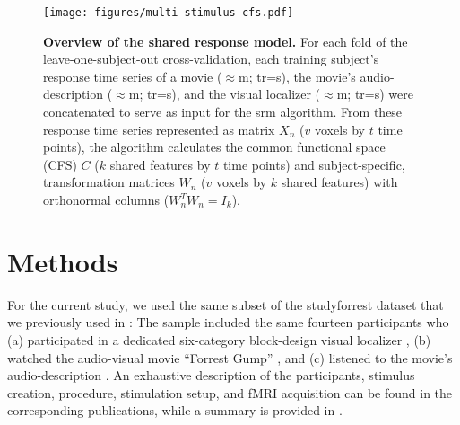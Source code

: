 
\begin{figure*}[tbp]
\centering
\texttt{[image: figures/multi-stimulus-cfs.pdf]}
\caption{
%
\textbf{Overview of the shared response model.
}
    For each fold of the leave-one-subject-out cross-validation, each training
    subject's response time series of
    a movie ($\approx$\unit[120]{m}; \ac{tr}=\unit[2]{s}),
    the movie's audio-description ($\approx$\unit[120]{m}; \ac{tr}=\unit[2]{s}),
    and the visual localizer ($\approx$\unit[21]{m}; \ac{tr}=\unit[2]{s})
    were concatenated to serve as input for the \ac{srm} algorithm.
    From these response time series represented as matrix $X_{n}$ ({$v$} voxels
    by $t$ time points), the algorithm calculates the common functional
    space (CFS) $C$ ($k$ shared features by $t$ time points) and
    subject-specific, transformation matrices $W_{n}$
    ($v$ voxels by $k$ shared features) with orthonormal columns
    ($W_{n}^{T}W_{n}=I_{k}$).
} \label{fig:multi-stimulus-cfs} \end{figure*}





\section{Methods}


For the current study, we used the same subset of the studyforrest dataset that
we previously used in \citet{haeusler2022processing}:
%
The sample included the same fourteen participants who
(a) participated in a dedicated six-category block-design visual localizer
\citep{sengupta2016extension},
(b) watched the audio-visual movie ``Forrest Gump''
\citep{hanke2016simultaneous}, and
(c) listened to the movie's audio-description \citep{hanke2014audiomovie}.
An exhaustive description of the participants, stimulus creation, procedure,
stimulation setup, and fMRI acquisition can be found in the corresponding
publications, while a summary is provided in \citet{haeusler2022processing}.



